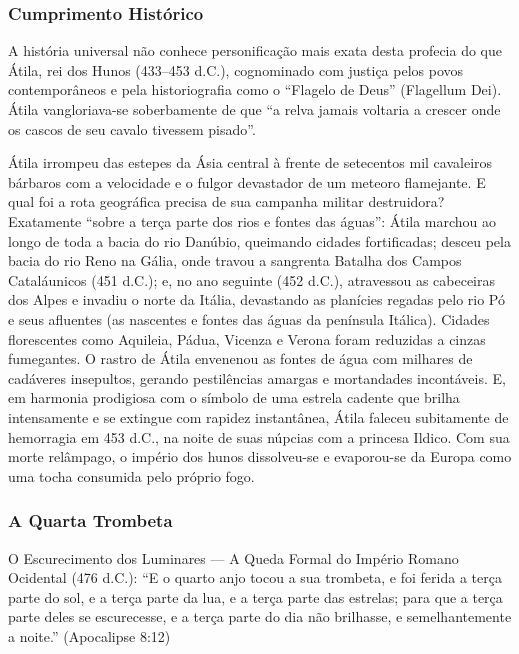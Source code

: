 \subsubsection*{Cumprimento Histórico}
A história universal não conhece personificação mais exata desta profecia do que Átila, rei dos Hunos (433–453 d.C.), cognominado com justiça pelos povos contemporâneos e pela historiografia como o ``Flagelo de Deus'' (Flagellum Dei). Átila vangloriava-se soberbamente de que ``a relva jamais voltaria a crescer onde os cascos de seu cavalo tivessem pisado''.

Átila irrompeu das estepes da Ásia central à frente de setecentos mil cavaleiros bárbaros com a velocidade e o fulgor devastador de um meteoro flamejante. E qual foi a rota geográfica precisa de sua campanha militar destruidora? Exatamente ``sobre a terça parte dos rios e fontes das águas'':
Átila marchou ao longo de toda a bacia do rio Danúbio, queimando cidades fortificadas; desceu pela bacia do rio Reno na Gália, onde travou a sangrenta Batalha dos Campos Cataláunicos (451 d.C.); e, no ano seguinte (452 d.C.), atravessou as cabeceiras dos Alpes e invadiu o norte da Itália, devastando as planícies regadas pelo rio Pó e seus afluentes (as nascentes e fontes das águas da península Itálica). Cidades florescentes como Aquileia, Pádua, Vicenza e Verona foram reduzidas a cinzas fumegantes. O rastro de Átila envenenou as fontes de água com milhares de cadáveres insepultos, gerando pestilências amargas e mortandades incontáveis.
E, em harmonia prodigiosa com o símbolo de uma estrela cadente que brilha intensamente e se extingue com rapidez instantânea, Átila faleceu subitamente de hemorragia em 453 d.C., na noite de suas núpcias com a princesa Ildico. Com sua morte relâmpago, o império dos hunos dissolveu-se e evaporou-se da Europa como uma tocha consumida pelo próprio fogo.


\subsubsection*{A Quarta Trombeta}
O Escurecimento dos Luminares — A Queda Formal do Império Romano Ocidental (476 d.C.):
``E o quarto anjo tocou a sua trombeta, e foi ferida a terça parte do sol, e a terça parte da lua, e a terça parte das estrelas; para que a terça parte deles se escurecesse, e a terça parte do dia não brilhasse, e semelhantemente a noite.'' (Apocalipse 8:12)



